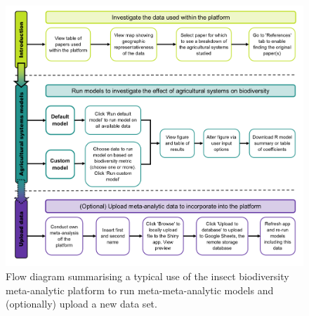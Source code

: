 \documentclass[11pt]{article}
\begin{document}
		\begin{figure}[H] 
			\centering 
			\includegraphics[scale=0.5]{figure_1_app_usage_flow_diagram.png} 
			\caption{Flow diagram summarising a typical use of the insect biodiversity meta-analytic platform to run meta-meta-analytic models and (optionally) upload a new data set.}  
		\end{figure}
		
\end{document}
